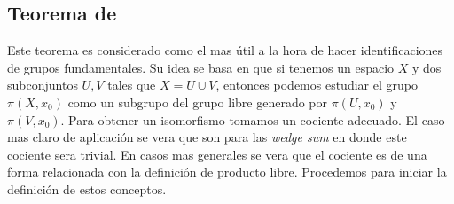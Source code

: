 \subsection{Teorema de \vank}
Este teorema es considerado como el mas útil a la hora de hacer
identificaciones de grupos fundamentales. Su idea se basa en que si
tenemos un espacio \(X\) y dos subconjuntos \(U,V\) tales que \(X = U
\cup V\), entonces podemos estudiar el grupo \(\pi (X, x_0)\) como un
subgrupo del grupo libre generado por \(\pi (U, x_0)\) y \(\pi (V,
x_0)\). Para obtener un isomorfismo tomamos un cociente adecuado. El
caso mas claro de aplicación se vera que son para las \emph{wedge sum}
en donde este cociente sera trivial. En casos mas generales se vera que
el cociente es de una forma relacionada con la definición de producto
libre. Procedemos para iniciar la definición de estos conceptos.

